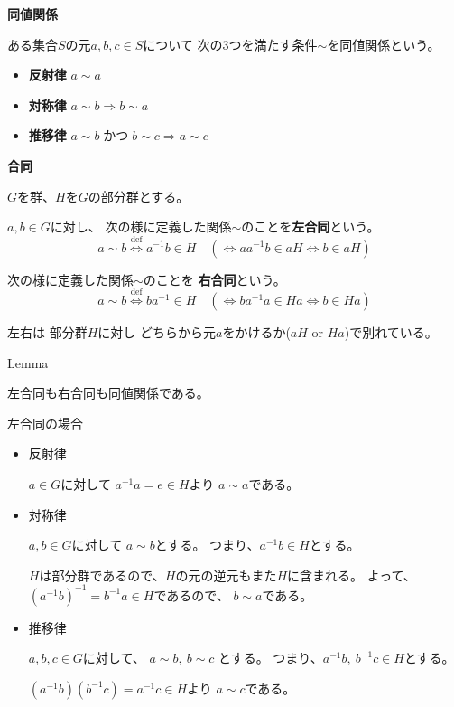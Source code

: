 \documentclass[12pt,b5paper]{ltjsarticle}
\begin{document}
\hrulefill

\textbf{同値関係}

ある集合$S$の元$a,b,c\in S$について
次の3つを満たす条件$\sim$を同値関係という。
\begin{itemize}
 \item \textbf{反射律} $ a \sim a$
 \item \textbf{対称律} $ a \sim b \Rightarrow b \sim a$
 \item \textbf{推移律} $ a \sim b \; かつ \; b \sim c \Rightarrow a \sim c$
\end{itemize}


\hrulefill

\textbf{合同}

$G$を群、$H$を$G$の部分群とする。

$a,b\in G$に対し、
次の様に定義した関係$\sim$のことを\textbf{左合同}という。
\begin{equation}
 a \sim b \overset{\mathrm{def}}{\iff} a^{-1}b\in H
  \quad (\iff aa^{-1}b\in aH \iff b \in aH)
\end{equation}

次の様に定義した関係$\sim$のことを
\textbf{右合同}という。
\begin{equation}
 a \sim b \overset{\mathrm{def}}{\iff} ba^{-1}\in H
  \quad(\iff ba^{-1}a\in Ha \iff b \in Ha)
\end{equation}

左右は 部分群$H$に対し
どちらから元$a$をかけるか($aH$ \: or \: $Ha$)で別れている。

\dotfill

Lemma

左合同も右合同も同値関係である。


左合同の場合

\begin{itemize}
 \item
      反射律

      $a\in G$に対して
      $a^{-1}a = e \in H$より
      $a\sim a$である。

 \item
      対称律

      $a,b\in G$に対して
      $a \sim b$とする。
      つまり、$a^{-1}b\in H$とする。

      $H$は部分群であるので、$H$の元の逆元もまた$H$に含まれる。
      よって、
      $(a^{-1}b)^{-1} = b^{-1}a\in H$であるので、
      $b\sim a$である。

 \item
      推移律

      $a,b,c\in G$に対して、
      $a\sim b, \: b\sim c$
      とする。
      つまり、$a^{-1}b , \: b^{-1}c \in H$とする。

      $(a^{-1}b)(b^{-1}c) = a^{-1}c \in H$より
      $a\sim c$である。
\end{itemize}
\end{document}
